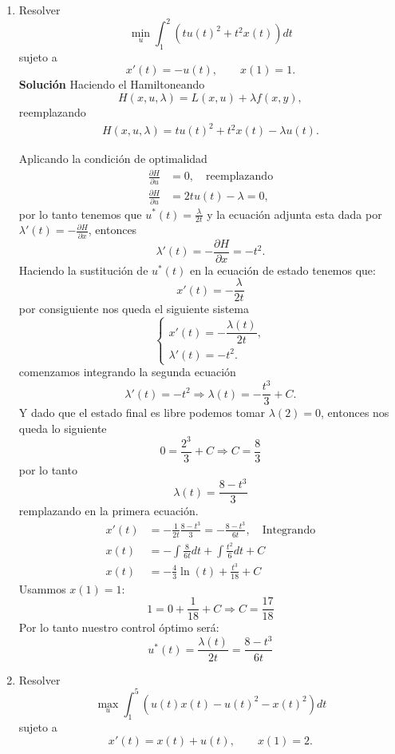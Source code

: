 \documentclass{uofa-eng-assignment}
\begin{document}
\maketitle
\begin{enumerate}
    \item[\textbf{Ejercicio 1.2}] Resolver
    \[
    \min_{u} \int_{1}^{2} \left( t u(t)^2 + t^2 x(t) \right) dt
    \]
    sujeto a
    \[
    x'(t) = -u(t), \qquad x(1) = 1.
    \]
\textbf{Solución}
Haciendo el Hamiltoneando
\[
H(x,u, \lambda)= L(x,u)+\lambda f(x,y),
\]
reemplazando
\begin{align*}
    H(x,u,\lambda)=  t u(t)^2 + t^2 x(t)-\lambda u(t).
\end{align*}

Aplicando la condición de optimalidad
\begin{align*}
     \frac{\partial H}{\partial u}&=0, \quad \text{reemplazando}\\
     \frac{\partial H}{\partial u}&=2tu(t)-\lambda=0,
\end{align*}
por lo tanto tenemos que  $u^*(t)=\frac{\lambda}{2t}$ y la ecuación adjunta esta dada por $\lambda '(t)= - \frac{\partial H}{\partial x}$, entonces
\[
\lambda'(t)= - \frac{\partial H}{\partial x}=-t^2.
\]
Haciendo la sustitución de $u^*(t)$ en la ecuación de estado tenemos que:
\[
 x'(t) =-\frac{\lambda}{2t}
\]
por consiguiente nos queda el siguiente sistema 
\[
\begin{cases}
x'(t) = -\dfrac{\lambda(t)}{2t}, \\
\lambda'(t) = -t^2.
\end{cases}
\]
comenzamos integrando la segunda ecuación
\[
 \lambda'(t)=-t^2 \Rightarrow \lambda(t) = -   \frac{t^3}{3}+C.
\]
Y dado que el estado final es libre podemos tomar  $\lambda(2)=0$, entonces nos queda lo siguiente 
\[
0=\frac{2^3}{3}+C \Rightarrow C = \frac{8}{3}
\]
por lo tanto
\[
 \lambda(t)= \frac{8-t^3}{3}
\]
remplazando en la primera ecuación.
\begin{align*}
        x'(t) &= -\frac{1}{2t} \frac{8-t^3}{3}= -\frac{8-t^3}{6t}, \quad \text{Integrando} \\
    x(t) &= - \int  \frac{8}{6t}dt+\int \frac{t^2}{6}dt+C \\
    x(t)&= -\frac{4}{3}\ln (t)+\frac{t^3}{18}+C
\end{align*}
Usammos $x(1)=1:$
\[
1=0+\frac{1}{18}+C \Rightarrow C=\frac{17}{18}
\]
Por lo tanto nuestro control óptimo será:
\[
 u^*(t)= \frac{\lambda(t)}{2t}= \frac{8-t^3}{6t}
\]
    \item[\textbf{Ejercicio 1.3}] Resolver
    \[
    \max_{u} \int_{1}^{5} \left( u(t)x(t) - u(t)^2 - x(t)^2 \right) dt
    \]
    sujeto a
    \[
    x'(t) = x(t) + u(t), \qquad x(1) = 2.
    \]


\end{enumerate}
\end{document}
